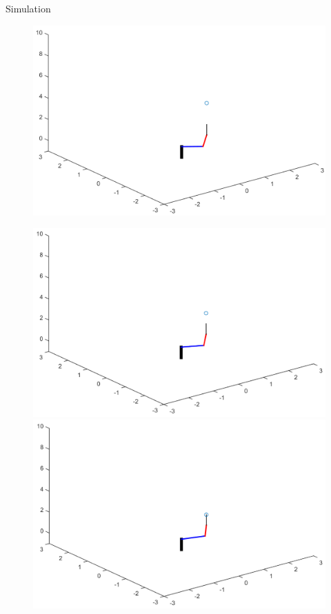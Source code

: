 \documentclass[a4paper,11pt]{article}
\begin{document}
\begin{section}{Simulation}
\begin{figure}[!htb]
\begin{minipage}{0.4\textwidth}
   \end{minipage}\hfill
   \begin{minipage}{0.4\textwidth}
     \centering
     \includegraphics[width=1.25\linewidth]{FIG6.png}
   \end{minipage}
\end{figure}
\vspace{10mm}
\begin{figure}[!htb]
   \begin{minipage}{0.4\textwidth}
     \centering
     \includegraphics[width=1.25\linewidth]{FIG7.png}
   \end{minipage}\hfill
   \begin{minipage}{0.4\textwidth}
     \centering
     \includegraphics[width=1.25\linewidth]{FIG8.png}

\end{minipage}
\end{figure}
\end{section}
\end{document}
